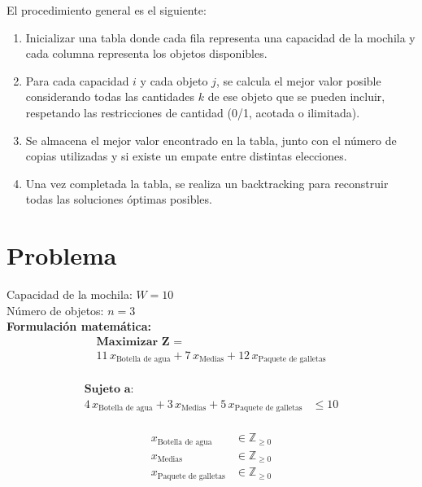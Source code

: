 \documentclass[12pt]{article}
\begin{document}
El procedimiento general es el siguiente:
\begin{enumerate}
  \item Inicializar una tabla donde cada fila representa una capacidad de la mochila y cada columna representa los objetos disponibles.
  \item Para cada capacidad $i$ y cada objeto $j$, se calcula el mejor valor posible considerando todas las cantidades $k$ de ese objeto que se pueden incluir, respetando las restricciones de cantidad (0/1, acotada o ilimitada).
  \item Se almacena el mejor valor encontrado en la tabla, junto con el número de copias utilizadas y si existe un empate entre distintas elecciones.
  \item Una vez completada la tabla, se realiza un backtracking para reconstruir todas las soluciones óptimas posibles.
\end{enumerate}

\bigskip
\section*{Problema}
Capacidad de la mochila: $W = 10$\\
Número de objetos: $n = 3$\\

\textbf{Formulación matemática:}\\
\begin{align*}
\textbf{Maximizar Z = }\\
11\,x_{\text{Botella de agua}} + 7\,x_{\text{Medias}} + 12\,x_{\text{Paquete de galletas}}
\end{align*}
\bigskip\bigskip
\textbf{}\\
\begin{align*}
\textbf{Sujeto a:}\\
4\,x_{\text{Botella de agua}} + 3\,x_{\text{Medias}} + 5\,x_{\text{Paquete de galletas}} &\leq 10
\end{align*}
\bigskip\bigskip
\textbf{}\\
\begin{align*}
x_{\text{Botella de agua}} &\in \mathbb{Z}_{\geq 0}\\
x_{\text{Medias}} &\in \mathbb{Z}_{\geq 0}\\
x_{\text{Paquete de galletas}} &\in \mathbb{Z}_{\geq 0}\\
\end{align*}
\end{document}
